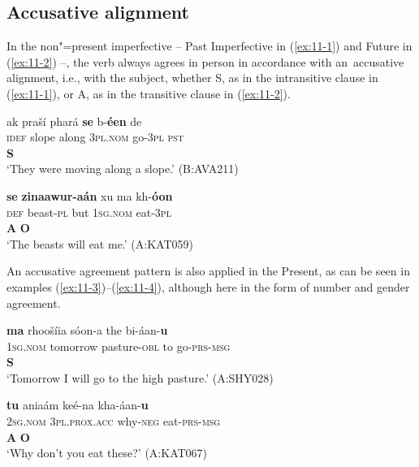 \subsection{Accusative alignment}
\label{subsec:11-1-1}


In the non"=present imperfective -- Past Imperfective in (\ref{ex:11-1}) and Future in (\ref{ex:11-2}) --, the verb always agrees in person in accordance with an~accusative alignment, i.e., with the subject, whether S, as in the intransitive clause in (\ref{ex:11-1}), or A, as in the transitive clause in (\ref{ex:11-2}). 

\begin{exe}
\ex
\label{ex:11-1}
\glll ak praší phará \textbf{se} b-\textbf{éen} de \\
\textsc{idef} slope along \textsc{3pl.nom} go-\textsc{3pl} \textsc{pst} \\
{} {} {}  \textbf{S} \\
\glt `They were moving along a slope.' (B:AVA211)

\ex
\label{ex:11-2}
\glll \textbf{se} \textbf{zinaawur-aán} xu ma kh-\textbf{óon} \\
\textsc{def} beast-\textsc{pl} but \textsc{1sg.nom} eat-\textsc{3pl} \\
 \textbf{A} {} {}  \textbf{O} \\
\glt `The beasts will eat me.' (A:KAT059)
\end{exe}

An accusative agreement pattern is also applied in the Present, as can be seen in examples (\ref{ex:11-3})--(\ref{ex:11-4}), although here in the form of number and gender agreement.

\begin{exe}
\ex
\label{ex:11-3}
\glll \textbf{ma} rhoošíia sóon-a the bi-áan-\textbf{u}\\
\textsc{1sg.nom} tomorrow pasture-\textsc{obl} to go-\textsc{prs-}\textsc{msg}\\
\textbf{S}\\
\glt `Tomorrow I will go to the high pasture.' (A:SHY028)

\ex
\label{ex:11-4}
\glll \textbf{tu} aniaám keé-na kha-áan-\textbf{u}\\
\textsc{2sg.nom} \textsc{3pl.prox.acc} why-\textsc{neg} eat-\textsc{prs-}\textsc{msg} \\
\textbf{A} \textbf{O}\\
\glt `Why don't you eat these?' (A:KAT067)
\end{exe}

